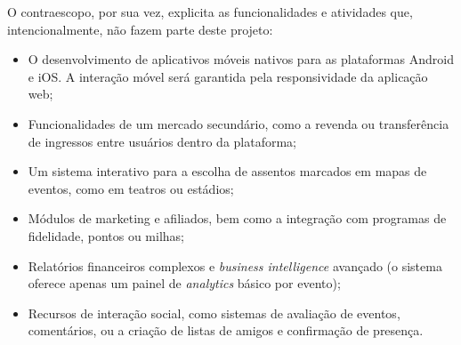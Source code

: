 O contraescopo, por sua vez, explicita as funcionalidades e atividades que, intencionalmente, não fazem parte deste projeto:
\begin{itemize}
    \item O desenvolvimento de aplicativos móveis nativos para as plataformas Android e iOS. A interação móvel será garantida pela responsividade da aplicação web;
    \item Funcionalidades de um mercado secundário, como a revenda ou transferência de ingressos entre usuários dentro da plataforma;
    \item Um sistema interativo para a escolha de assentos marcados em mapas de eventos, como em teatros ou estádios;
    \item Módulos de marketing e afiliados, bem como a integração com programas de fidelidade, pontos ou milhas;
    \item Relatórios financeiros complexos e \textit{business intelligence} avançado (o sistema oferece apenas um painel de \textit{analytics} básico por evento);
    \item Recursos de interação social, como sistemas de avaliação de eventos, comentários, ou a criação de listas de amigos e confirmação de presença.
\end{itemize}
